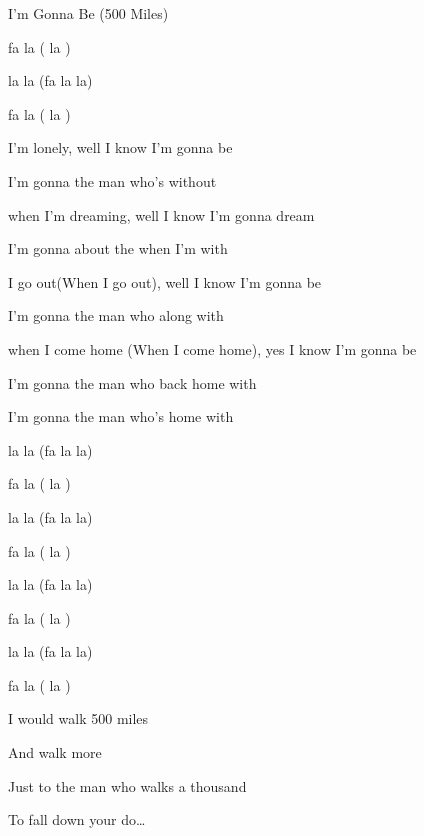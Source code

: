 \begin{SBSong}{I'm Gonna Be (500 Miles)}
\begin{SBChorus*}
	fa  la ( la )

	 la la (fa la la)
	
	fa  la ( la )
  \end{SBChorus*}
  \begin{SBVerse}
     I'm lonely, well I know I'm gonna be

	I'm gonna  the man who's  without 

     when I'm dreaming, well I know I'm gonna dream

	I'm gonna  about the  when I'm with 

     I go out(When I go out), well I know I'm gonna be

	I'm gonna  the man who  along with 

     when I come home (When I come home), yes I know I'm gonna be

	I'm gonna  the man who  back home with 

	I'm gonna  the man who's  home with 
  \end{SBVerse}
  \begin{SBChorus*}
	 la la (fa la la)
	
	fa  la ( la )

	 la la (fa la la)
	
	fa  la ( la )

	 la la (fa la la)
	
	fa  la ( la )

	 la la (fa la la)
	
	fa  la ( la )
  \end{SBChorus*}
  \begin{SBChorus}
     I would walk 500 miles

	And  walk  more

	Just to  the man who walks a thousand 

	To fall down  your do\ldots{}
  \end{SBChorus}
 \end{SBSong}
